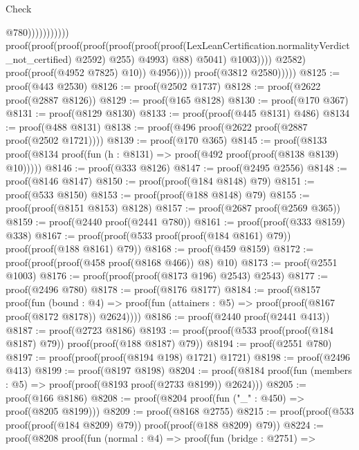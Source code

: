 \begin{lexlean}{Check}
\begin{coremodule}
                                                                              @780)))))))))))
                                    proof(proof(proof(proof(proof(proof(proof(LexLeanCertification.normalityVerdict_not_certified)
                                                  @2592)
                                                @255)
                                              @4993)
                                            @88)
                                          @5041)
                                        @1003))))
                            @2582)
                          proof(proof(@4952 @7825) @10))
                        @4956))))
              proof(@3812 @2580)))))
@8125 := proof(@443 @2530)
@8126 := proof(@2502 @1737)
@8128 := proof(@2622 proof(@2887 @8126))
@8129 := proof(@165 @8128)
@8130 := proof(@170 @367)
@8131 := proof(@8129 @8130)
@8133 := proof(proof(@445 @8131) @486)
@8134 := proof(@488 @8131)
@8138 := proof(@496 proof(@2622 proof(@2887 proof(@2502 @1721))))
@8139 := proof(@170 @365)
@8145 := proof(@8133
      proof(@8134 proof(fun (h : @8131) => proof(@492 proof(proof(@8138 @8139) @10)))))
@8146 := proof(@333 @8126)
@8147 := proof(@2495 @2556)
@8148 := proof(@8146 @8147)
@8150 := proof(proof(@184 @8148) @79)
@8151 := proof(@533 @8150)
@8153 := proof(proof(@188 @8148) @79)
@8155 := proof(proof(@8151 @8153) @8128)
@8157 := proof(@2687 proof(@2569 @365))
@8159 := proof(@2440 proof(@2441 @780))
@8161 := proof(proof(@333 @8159) @338)
@8167 := proof(proof(@533 proof(proof(@184 @8161) @79)) proof(proof(@188 @8161) @79))
@8168 := proof(@459 @8159)
@8172 := proof(proof(proof(@458 proof(@8168 @466)) @8) @10)
@8173 := proof(@2551 @1003)
@8176 := proof(proof(proof(@8173 @196) @2543) @2543)
@8177 := proof(@2496 @780)
@8178 := proof(@8176 @8177)
@8184 := proof(@8157
      proof(fun (bound : @4) =>
        proof(fun (attainers : @5) => proof(proof(@8167 proof(@8172 @8178)) @2624))))
@8186 := proof(@2440 proof(@2441 @413))
@8187 := proof(@2723 @8186)
@8193 := proof(proof(@533 proof(proof(@184 @8187) @79)) proof(proof(@188 @8187) @79))
@8194 := proof(@2551 @780)
@8197 := proof(proof(proof(@8194 @198) @1721) @1721)
@8198 := proof(@2496 @413)
@8199 := proof(@8197 @8198)
@8204 := proof(@8184 proof(fun (members : @5) => proof(proof(@8193 proof(@2733 @8199)) @2624)))
@8205 := proof(@166 @8186)
@8208 := proof(@8204 proof(fun ("_" : @450) => proof(@8205 @8199)))
@8209 := proof(@8168 @2755)
@8215 := proof(proof(@533 proof(proof(@184 @8209) @79)) proof(proof(@188 @8209) @79))
@8224 := proof(@8208
      proof(fun (normal : @4) =>
        proof(fun (bridge : @2751) =>

\end{coremodule}
\end{lexlean}
